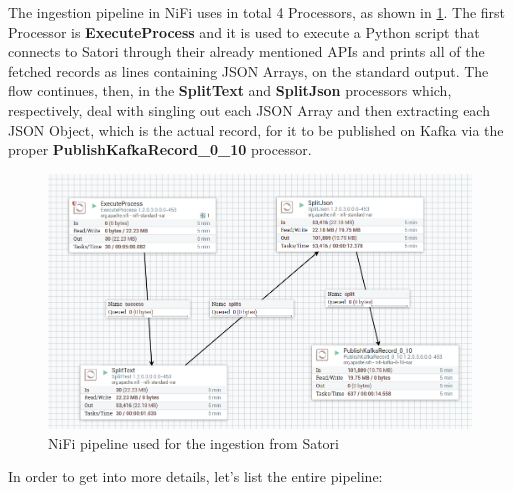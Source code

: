The ingestion pipeline in NiFi uses in total 4 Processors, as shown in \ref{fig:nifipipeline}. The first Processor is \textbf{ExecuteProcess} and it is used to execute a Python script that connects to Satori through their already mentioned APIs and prints all of the fetched records as lines containing JSON Arrays, on the standard output. The flow continues, then, in the \textbf{SplitText} and \textbf{SplitJson} processors which, respectively, deal with singling out each JSON Array and then extracting each JSON Object, which is the actual record, for it to be published on Kafka via the proper \textbf{PublishKafkaRecord\_0\_10} processor.

\begin{figure}[ph]
    \centering
    \includegraphics[width=0.7\linewidth]{Figures/nifipipeline}
    \caption{NiFi pipeline used for the ingestion from Satori}
    \label{fig:nifipipeline}
\end{figure}
\pagebreak
In order to get into more details, let's list the entire pipeline:

